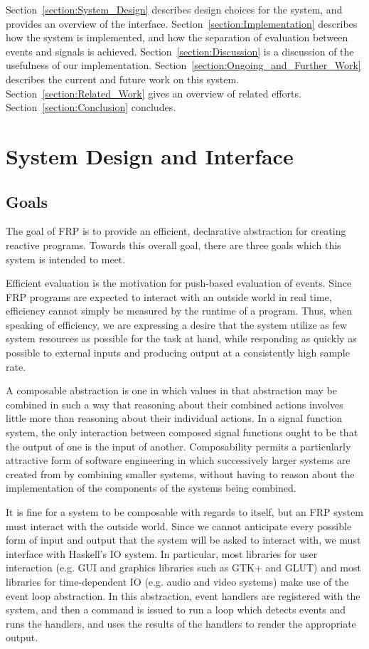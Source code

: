 \documentclass[draft]{llncs}
\begin{document}
Section~\ref{section:System_Design} describes design choices for the system,
and provides an overview of the interface. Section~\ref{section:Implementation}
describes how the system is implemented, and how the separation of evaluation
between events and signals is achieved. Section~\ref{section:Discussion} is a
discussion of the usefulness of our implementation. 
Section~\ref{section:Ongoing_and_Further_Work} describes the current and future
work on this system. Section~\ref{section:Related_Work} gives an overview of
related efforts. Section~\ref{section:Conclusion} concludes.

\section{System Design and Interface}
\label{section:System_Design_and_Interface}

\subsection{Goals}
\label{section:System_Design_and_Interface-Goals}

The goal of FRP is to provide an efficient, declarative abstraction for creating
reactive programs. Towards this overall goal, there are three goals which this
system is intended to meet.

Efficient evaluation is the motivation for push-based evaluation of events.
Since FRP programs are expected to  interact with an outside world in real time,
efficiency cannot simply be measured by the runtime of a program. Thus, when speaking of efficiency,
we are expressing a desire that the system utilize as few system resources as possible
for the task at hand, while responding as quickly as possible to external inputs and
producing output at a consistently high sample rate.

A composable abstraction is one in which values in that abstraction may be
combined in such a way that reasoning about their combined actions involves
little more than reasoning about their individual actions. In a signal function
system, the only interaction between composed signal functions ought to be that
the output of one is the input of another. Composability permits a particularly
attractive form of software engineering in which successively larger systems are
created from by combining smaller systems, without having to reason about the 
implementation of the components of the systems being combined.

It is fine for a system to be composable with regards to itself, but an FRP
system must interact with the outside world. Since we cannot anticipate every
possible form of input and output that the system will be asked to interact
with, we must interface with Haskell's IO system. In particular, most libraries
for user interaction (e.g. GUI and graphics libraries such as GTK+ and GLUT) and
most libraries for time-dependent IO (e.g. audio and video systems) make use of
the event loop abstraction. In this abstraction, event handlers are registered
with the system, and then a command is issued to run a loop which detects events
and runs the handlers, and uses the results of the handlers to render the
appropriate output. 
\end{document}
